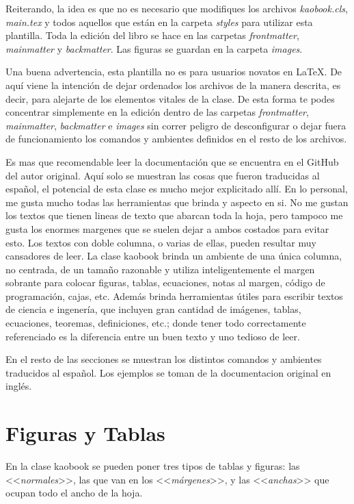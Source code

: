 Reiterando, la idea es que no es necesario que modifiques los archivos \emph{kaobook.cls}, \emph{main.tex} y todos aquellos que están en la carpeta \emph{styles} para utilizar esta plantilla. Toda la edición del libro se hace en las carpetas \emph{frontmatter}, \emph{mainmatter} y \emph{backmatter}. Las figuras se guardan en la carpeta \emph{images}. 

Una buena advertencia, esta plantilla no es para usuarios novatos en \LaTeX. De aquí viene la intención de dejar ordenados los archivos de la manera descrita, es decir, para alejarte de los elementos vitales de la clase. De esta forma te podes concentrar simplemente en la edición dentro de las carpetas \emph{frontmatter}, \emph{mainmatter}, \emph{backmatter} e \emph{images} sin correr peligro de desconfigurar o dejar fuera de funcionamiento los comandos y ambientes definidos en el resto de los archivos.

Es mas que recomendable leer la documentación que se encuentra en el GitHub del autor original. Aquí solo se muestran las cosas que fueron traducidas al español, el potencial de esta clase es mucho mejor explicitado allí. En lo personal, me gusta mucho todas las herramientas que brinda y aspecto en si. No me gustan los textos que tienen lineas de texto que abarcan toda la hoja, pero tampoco me gusta los enormes margenes que se suelen dejar a ambos costados para evitar esto. Los textos con doble columna, o varias de ellas, pueden resultar muy cansadores de leer. La clase kaobook brinda un ambiente de una única columna, no centrada, de un tamaño razonable y utiliza inteligentemente el margen sobrante para colocar figuras, tablas, ecuaciones, notas al margen, código de programación, cajas, etc. Además brinda herramientas útiles para escribir textos de ciencia e ingenería, que incluyen gran cantidad de imágenes, tablas, ecuaciones, teoremas, definiciones, etc.; donde tener todo correctamente referenciado es la diferencia entre un buen texto y uno tedioso de leer.

En el resto de las secciones se muestran los distintos comandos y ambientes traducidos al español. Los ejemplos se toman de la documentacion original en inglés.
    
\section{Figuras y Tablas}
En la clase kaobook se pueden poner tres tipos de tablas y figuras: las <<\emph{normales}>>, las que van en los <<\emph{márgenes}>>, y las <<\emph{anchas}>> que ocupan todo el ancho de la hoja.

